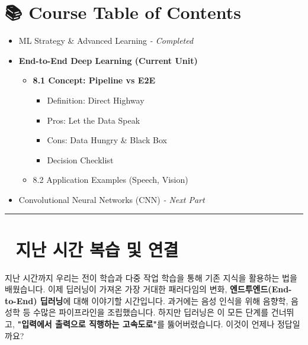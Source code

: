 \documentclass[11pt,a4paper]{book}
\theoremstyle{definition}
\begin{document}
\section*{📚 Course Table of Contents}
\begin{itemize}
    \item[Chapter 1-7.] ML Strategy \& Advanced Learning \textit{- Completed}
    \item[\textbf{Chapter 8.}] \textbf{End-to-End Deep Learning (Current Unit)}
    \begin{itemize}
        \item \textbf{8.1 Concept: Pipeline vs E2E}
        \begin{itemize}
            \item Definition: Direct Highway
            \item Pros: Let the Data Speak
            \item Cons: Data Hungry \& Black Box
            \item Decision Checklist
        \end{itemize}
        \item 8.2 Application Examples (Speech, Vision)
    \end{itemize}
    \item[Chapter 9.] Convolutional Neural Networks (CNN) \textit{- Next Part}
\end{itemize}

\vspace{0.5cm}
\hrule
\vspace{0.5cm}

\section*{🔗 지난 시간 복습 및 연결}
지난 시간까지 우리는 전이 학습과 다중 작업 학습을 통해 기존 지식을 활용하는 법을 배웠습니다.
이제 딥러닝이 가져온 가장 거대한 패러다임의 변화, \textbf{엔드투엔드(End-to-End) 딥러닝}에 대해 이야기할 시간입니다.
과거에는 음성 인식을 위해 음향학, 음성학 등 수많은 파이프라인을 조립했습니다. 하지만 딥러닝은 이 모든 단계를 건너뛰고, \textbf{"입력에서 출력으로 직행하는 고속도로"}를 뚫어버렸습니다. 이것이 언제나 정답일까요?

\end{document}
